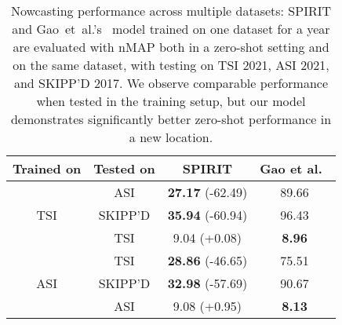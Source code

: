 \begin{table}[t]
  \caption{
  Nowcasting performance across multiple datasets: SPIRIT and Gao~et~al.'s~\cite{wacv2022} model trained on one dataset for a year are evaluated with nMAP both in a zero-shot setting and on the same dataset, with testing on TSI 2021, ASI 2021, and SKIPP'D 2017. We observe comparable performance when tested in the training setup, but our model demonstrates significantly better zero-shot performance in a new location.
  }
  \label{tab:zeroshot_nowcast}
  \centering
  \renewcommand{\arraystretch}{1.2}
  \begin{tabular}{@{}c c c c@{}}
    \hline
    \textbf{Trained on} & \textbf{Tested on} & \textbf{SPIRIT} & \textbf{Gao et al.~\cite{wacv2022}} \\
    \hline
    \multirow{3}{*}{TSI} & ASI & \textbf{27.17} \small{\textcolor{mydarkgreen}{(-62.49)}} & 89.66 \\
                          & SKIPP'D & \textbf{35.94} \small{\textcolor{mydarkgreen}{(-60.94)}} & 96.43 \\
                          & TSI & 9.04 \small{\textcolor{mydarkred}{(+0.08)}} & \textbf{8.96} \\
    \cline{1-4}
    \multirow{3}{*}{ASI} & TSI & \textbf{28.86} \small{\textcolor{mydarkgreen}{(-46.65)}} & 75.51 \\
                          & SKIPP'D & \textbf{32.98} \small{\textcolor{mydarkgreen}{(-57.69)}} & 90.67 \\
                          & ASI & 9.08 \small{\textcolor{mydarkred}{(+0.95)}} & \textbf{8.13} \\
    \hline
  \end{tabular}
\end{table}




